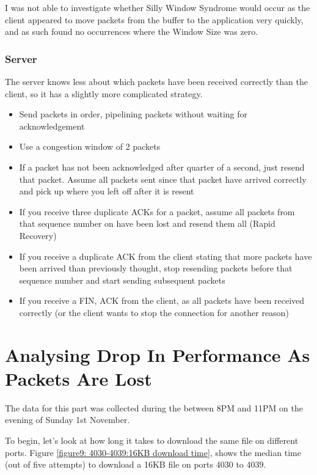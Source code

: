 \documentclass[12pt]{article}
\begin{document}
I was not able to investigate whether Silly Window Syndrome would occur as the client appeared to move packets from the buffer to the application very quickly, and as such found no occurrences where the Window Size was zero.

\subsubsection*{Server}
The server knows less about which packets have been received correctly than the client, so it has a slightly more complicated strategy.
\begin{itemize}
  \item Send packets in order, pipelining packets without waiting for acknowledgement
  \item Use a congestion window of 2 packets
  \item If a packet has not been acknowledged after quarter of a second, just resend that packet. Assume all packets sent since that packet have arrived correctly and pick up where you left off after it is resent
  \item If you receive three duplicate ACKs for a packet, assume all packets from that sequence number on have been lost and resend them all (Rapid Recovery)
  \item If you receive a duplicate ACK from the client stating that more packets have been arrived than previously thought, stop resending packets before that sequence number and start sending subsequent packets
  \item If you receive a FIN, ACK from the client, as all packets have been received correctly (or the client wants to stop the connection for another reason)
\end{itemize}

\section{Analysing Drop In Performance As Packets Are Lost}
The data for this part was collected during the between 8PM and 11PM on the evening of Sunday 1st November.

To begin, let's look at how long it takes to download the same file on different ports.
Figure \ref{figure9: 4030-4039:16KB download time}, shows the median time (out of five attempts) to download a 16KB file on ports 4030 to 4039. 
\end{document}
